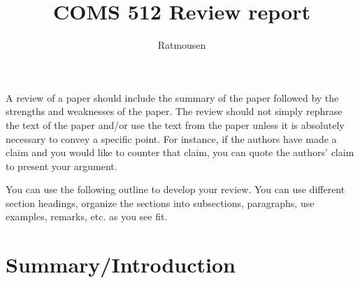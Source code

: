 \documentclass[11pt]{article}
\begin{document}
\title{COMS 512 Review report}
\author{Ratmousen}
\date{}
\maketitle

A review of a paper should include the summary of the paper followed
by the strengths and weaknesses of the paper.  The review should not
simply rephrase the text of the paper and/or use the text from the
paper unless it is absolutely necessary to convey a specific
point. For instance, if the authors have made a claim and you would
like to counter that claim, you can quote the authors' claim to
present your argument.

You can use the following outline to develop your review. You can use
different section headings, organize the sections into subsections,
paragraphs, use examples, remarks, etc. as you see fit.



\section{Summary/Introduction}
\label{sec:intro}
\end{document}
